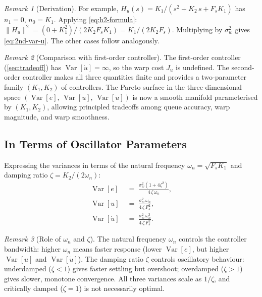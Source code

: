 \documentclass[11pt, a4paper]{article}
\theoremstyle{definition}
\theoremstyle{plain}
\theoremstyle{remark}
\newtheorem{remark}{Remark}[section]
\newcommand{\Var}{\operatorname{Var}}
\begin{document}
\begin{remark}[Derivation]
  For example, $H_u(s) = K_1/(s^2 + K_2\,s + F_s K_1)$ has
  $n_1 = 0$, $n_0 = K_1$.
  Applying \eqref{eq:h2-formula}:
  $\|H_u\|^2 = (0 + K_1^2)/(2 K_2 F_s K_1) = K_1/(2 K_2 F_s)$.
  Multiplying by $\sigma_w^2$ gives \eqref{eq:2nd-var-u}.
  The other cases follow analogously.
\end{remark}

\begin{remark}[Comparison with first-order controller]
  The first-order controller (\cref{sec:tradeoff}) has
  $\Var[\dot{u}] = \infty$, so the warp cost $J_u$ is undefined.
  The second-order controller makes all three quantities finite
  and provides a two-parameter family $(K_1, K_2)$ of controllers.
  The Pareto surface in the three-dimensional space
  $(\Var[e],\,\Var[u],\,\Var[\dot{u}])$ is now a smooth manifold
  parameterised by $(K_1, K_2)$, allowing principled tradeoffs
  among queue accuracy, warp magnitude, and warp smoothness.
\end{remark}

\subsection{In Terms of Oscillator Parameters}\label{sec:2nd-oscillator}

Expressing the variances in terms of the natural frequency
$\omega_n = \sqrt{F_s K_1}$ and damping ratio
$\zeta = K_2/(2\omega_n)$:
\begin{align}
  \Var[e]
    &\;=\; \frac{\sigma_w^2(1 + 4\zeta^2)}{4\,\zeta\,\omega_n},
    \label{eq:2nd-var-e-osc} \\[6pt]
  \Var[u]
    &\;=\; \frac{\sigma_w^2\,\omega_n}{4\,\zeta\,F_s^2},
    \label{eq:2nd-var-u-osc} \\[6pt]
  \Var[\dot{u}]
    &\;=\; \frac{\sigma_w^2\,\omega_n^3}{4\,\zeta\,F_s^2}.
    \label{eq:2nd-var-v-osc}
\end{align}

\begin{remark}[Role of $\omega_n$ and $\zeta$]
  The natural frequency $\omega_n$ controls the controller bandwidth:
  higher $\omega_n$ means faster response (lower $\Var[e]$, but higher
  $\Var[u]$ and $\Var[\dot{u}]$).  The damping ratio $\zeta$ controls
  oscillatory behaviour: underdamped ($\zeta < 1$) gives faster
  settling but overshoot; overdamped ($\zeta > 1$) gives slower,
  monotone convergence.  All three variances scale as $1/\zeta$,
  and critically damped ($\zeta = 1$) is not necessarily optimal.
\end{remark}
\end{document}
